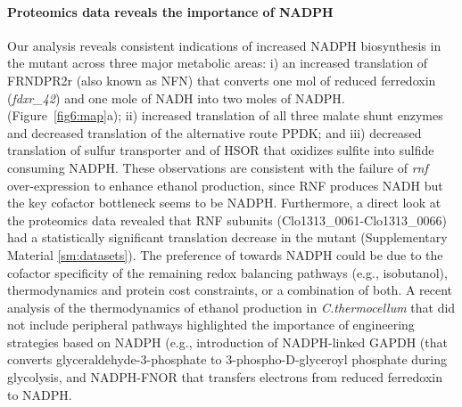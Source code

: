 \paragraph{Proteomics data reveals the importance of NADPH}
Our analysis reveals consistent indications of increased NADPH biosynthesis in the  mutant across three major metabolic areas: i) an increased translation of FRNDPR2r (also known as NFN) that converts one mol of reduced ferredoxin (\textit{fdxr\_42}) and one mole of NADH into two moles of NADPH.
(Figure~\ref{fig6:map}a);
ii) increased translation of all three malate shunt enzymes and decreased translation of the alternative route PPDK; %
and iii) decreased translation of sulfur transporter and of HSOR that oxidizes sulfite into sulfide consuming NADPH.
These observations are consistent with the failure of \textit{rnf} over-expression to enhance ethanol production\citep{lo2017}, since RNF produces NADH but the key cofactor bottleneck seems to be NADPH. Furthermore, a direct look at the proteomics data revealed that RNF subunits (Clo1313\_0061-Clo1313\_0066) had a statistically significant translation decrease in the mutant (Supplementary Material \ref{sm:datasets}).
The preference of  towards NADPH could be due to the cofactor specificity of the remaining redox balancing pathways (e.g., isobutanol), thermodynamics and protein cost constraints, or a combination of both. A recent analysis of the thermodynamics of ethanol production in \textit{C.thermocellum} that did not include peripheral pathways highlighted the importance of engineering strategies based on NADPH (e.g., introduction of NADPH-linked GAPDH (that converts glyceraldehyde-3-phosphate to 3-phospho-D-glyceroyl phosphate during glycolysis, and NADPH-FNOR that transfers electrons from reduced ferredoxin to NADPH.



